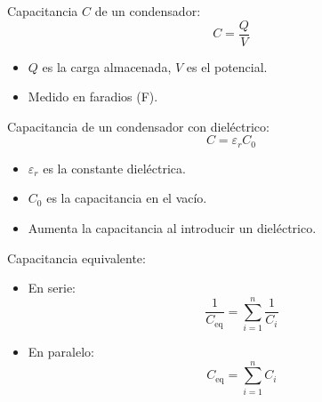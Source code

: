 \begin{tcolorbox}[title=Capacitancia]
  Capacitancia $C$ de un condensador:
  \[
    C = \frac{Q}{V}
  \]
  \begin{itemize}
    \item $Q$ es la carga almacenada, $V$ es el potencial.
    \item Medido en faradios (F).
  \end{itemize}
  Capacitancia de un condensador con dieléctrico:
  \[
    C = \varepsilon_r C_0
  \]
  \begin{itemize}
    \item $\varepsilon_r$ es la constante dieléctrica.
    \item $C_0$ es la capacitancia en el vacío.
    \item Aumenta la capacitancia al introducir un dieléctrico.
  \end{itemize}
  Capacitancia equivalente:
  \begin{itemize}
    \item En serie:
      \[
        \frac{1}{C_{\text{eq}}} = \sum_{i=1}^{n} \frac{1}{C_i}
      \]
    \item En paralelo:
      \[
        C_{\text{eq}} = \sum_{i=1}^{n} C_i
      \]
  \end{itemize}
\end{tcolorbox}
